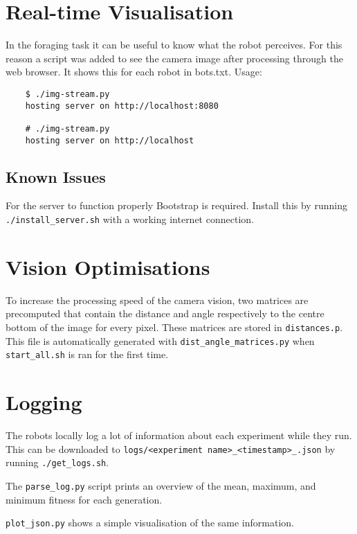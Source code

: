 \documentclass{article}
\begin{document}
	\section{Real-time Visualisation} %
	\label{apx:sec:visualisation}
	In the foraging task it can be useful to know what the robot perceives. For
	this reason a script was added to see the camera image after processing
	through the web browser. It shows this for each robot in bots.txt. Usage:
	\begin{verbatim}
	$ ./img-stream.py
	hosting server on http://localhost:8080

	# ./img-stream.py
	hosting server on http://localhost
	\end{verbatim}
	\subsection{Known Issues} %
	\label{apx:sub:known_issues}
	For the server to function properly Bootstrap is required. Install this
	by running \texttt{./install\_server.sh} with a working internet
	connection.

	\section{Vision Optimisations} %
	\label{apx:sec:vision_optimisations}
	To increase the processing speed of the camera vision, two matrices are
	precomputed that contain the distance and angle respectively to the centre
	bottom of the image for every pixel.
	These matrices are stored in \texttt{distances.p}. This file is
	automatically generated with \texttt{dist\_angle\_matrices.py} when
	\texttt{start\_all.sh} is ran for the first time.

	\section{Logging} %
	\label{apx:sec:logging}
	The robots locally log a lot of information about each experiment while
	they run. This can be downloaded to \texttt{logs/<experiment
	name>\_<timestamp>\_<git hash>.json} by running \texttt{./get\_logs.sh}.

	The \texttt{parse\_log.py} script prints an overview of the mean, maximum,
	and minimum fitness for each generation.

	\texttt{plot\_json.py} shows a simple visualisation of the same
	information.




\end{document}
